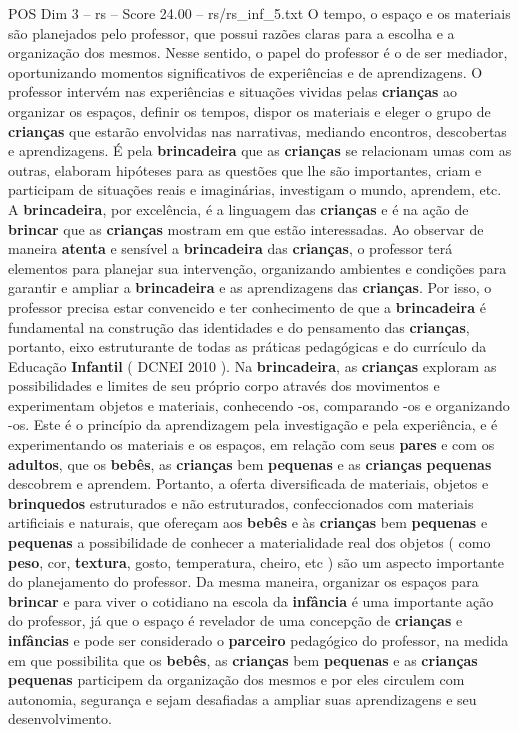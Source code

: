\begin{textsample}{POS Dim 3 – rs – Score 24.00 – rs/rs\_inf\_5.txt}
O tempo, o espaço e os materiais são planejados pelo professor, que possui razões claras para a escolha e a organização dos mesmos.
Nesse sentido, o papel do professor é o de ser mediador, oportunizando momentos significativos de experiências e de aprendizagens.
O professor intervém nas experiências e situações vividas pelas \textbf{crianças} ao organizar os espaços, definir os tempos, dispor os materiais e eleger o grupo de \textbf{crianças} que estarão envolvidas nas narrativas, mediando encontros, descobertas e aprendizagens.
É pela \textbf{brincadeira} que as \textbf{crianças} se relacionam umas com as outras, elaboram hipóteses para as questões que lhe são importantes, criam e participam de situações reais e imaginárias, investigam o mundo, aprendem, etc.
A \textbf{brincadeira}, por excelência, é a linguagem das \textbf{crianças} e é na ação de \textbf{brincar} que as \textbf{crianças} mostram em que estão interessadas.
Ao observar de maneira \textbf{atenta} e sensível a \textbf{brincadeira} das \textbf{crianças}, o professor terá elementos para planejar sua intervenção, organizando ambientes e condições para garantir e ampliar a \textbf{brincadeira} e as aprendizagens das \textbf{crianças}.
Por isso, o professor precisa estar convencido e ter conhecimento de que a \textbf{brincadeira} é fundamental na construção das identidades e do pensamento das \textbf{crianças}, portanto, eixo estruturante de todas as práticas pedagógicas e do currículo da Educação \textbf{Infantil} ( DCNEI 2010 ).
Na \textbf{brincadeira}, as \textbf{crianças} exploram as possibilidades e limites de seu próprio corpo através dos movimentos e experimentam objetos e materiais, conhecendo -os, comparando -os e organizando -os.
Este é o princípio da aprendizagem pela investigação e pela experiência, e é experimentando os materiais e os espaços, em relação com seus \textbf{pares} e com os \textbf{adultos}, que os \textbf{bebês}, as \textbf{crianças} bem \textbf{pequenas} e as \textbf{crianças} \textbf{pequenas} descobrem e aprendem.
Portanto, a oferta diversificada de materiais, objetos e \textbf{brinquedos} estruturados e não estruturados, confeccionados com materiais artificiais e naturais, que ofereçam aos \textbf{bebês} e às \textbf{crianças} bem \textbf{pequenas} e \textbf{pequenas} a possibilidade de conhecer a materialidade real dos objetos ( como \textbf{peso}, cor, \textbf{textura}, gosto, temperatura, cheiro, etc ) são um aspecto importante do planejamento do professor.
Da mesma maneira, organizar os espaços para \textbf{brincar} e para viver o cotidiano na escola da \textbf{infância} é uma importante ação do professor, já que o espaço é revelador de uma concepção de \textbf{crianças} e \textbf{infâncias} e pode ser considerado o \textbf{parceiro} pedagógico do professor, na medida em que possibilita que os \textbf{bebês}, as \textbf{crianças} bem \textbf{pequenas} e as \textbf{crianças} \textbf{pequenas} participem da organização dos mesmos e por eles circulem com autonomia, segurança e sejam desafiadas a ampliar suas aprendizagens e seu desenvolvimento.

\end{textsample}
